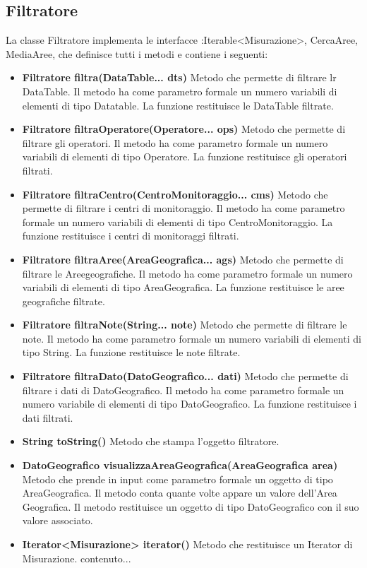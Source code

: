 \documentclass[a4paper, 12pt]{report}
\begin{document}
			\subsection{Filtratore}
			La classe Filtratore implementa le interfacce :Iterable<Misurazione>, CercaAree, MediaAree, che definisce tutti i metodi e contiene i seguenti:
			\begin{itemize}
			\item \textbf{Filtratore filtra(DataTable... dts)}
			Metodo che permette di filtrare lr DataTable. Il metodo ha come parametro formale un numero variabili di elementi di tipo Datatable. La funzione restituisce le DataTable filtrate.
			\item \textbf{Filtratore filtraOperatore(Operatore... ops)}
			Metodo che permette di filtrare gli operatori. Il metodo ha come parametro formale un numero variabili di elementi di tipo Operatore. La funzione restituisce gli operatori filtrati.
			\item \textbf{Filtratore filtraCentro(CentroMonitoraggio... cms)}
			Metodo che permette di filtrare i centri di monitoraggio. Il metodo ha come parametro formale un numero variabili di elementi di tipo CentroMonitoraggio. La funzione restituisce i centri di monitoraggi filtrati.
			\item \textbf{Filtratore filtraAree(AreaGeografica... ags)}
			Metodo che permette di filtrare le Areegeografiche. Il metodo ha come parametro formale un numero variabili di elementi di tipo AreaGeografica. La funzione restituisce le aree geografiche filtrate.
			\item \textbf{Filtratore filtraNote(String... note)}
			Metodo che permette di filtrare le note. Il metodo ha come parametro formale un numero variabili di elementi di tipo String. La funzione restituisce le note filtrate.
			\item \textbf {Filtratore filtraDato(DatoGeografico... dati)}
			Metodo che permette di filtrare i dati di DatoGeografico. Il metodo ha come parametro formale un numero variabile di elementi di tipo DatoGeografico. La funzione restituisce i dati filtrati.
			\item \textbf {String toString()}
			Metodo che stampa l'oggetto filtratore.
			\item \textbf{DatoGeografico visualizzaAreaGeografica(AreaGeografica area)}
			Metodo che prende in input come parametro formale un oggetto di tipo AreaGeografica. Il metodo conta quante volte appare un valore dell'Area Geografica. Il metodo restituisce un oggetto di tipo DatoGeografico con il suo valore associato.
			\item \textbf{Iterator<Misurazione> iterator()}
			Metodo che restituisce un Iterator di Misurazione.	contenuto...
			\end{itemize}
\end{document}

